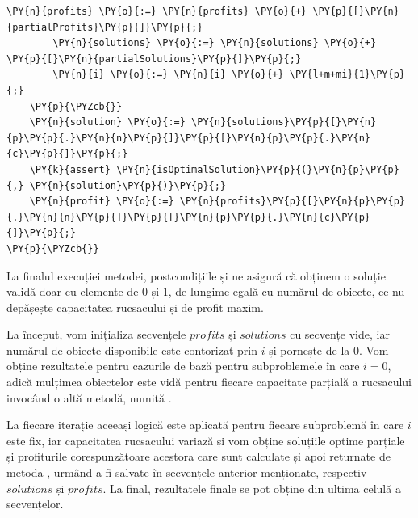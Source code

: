 \begin{sloppypar}
\begin{Verbatim}[commandchars=\\\{\}]
        \PY{n}{profits} \PY{o}{:=} \PY{n}{profits} \PY{o}{+} \PY{p}{[}\PY{n}{partialProfits}\PY{p}{]}\PY{p}{;}
        \PY{n}{solutions} \PY{o}{:=} \PY{n}{solutions} \PY{o}{+} \PY{p}{[}\PY{n}{partialSolutions}\PY{p}{]}\PY{p}{;}
        \PY{n}{i} \PY{o}{:=} \PY{n}{i} \PY{o}{+} \PY{l+m+mi}{1}\PY{p}{;} 
    \PY{p}{\PYZcb{}}
    \PY{n}{solution} \PY{o}{:=} \PY{n}{solutions}\PY{p}{[}\PY{n}{p}\PY{p}{.}\PY{n}{n}\PY{p}{]}\PY{p}{[}\PY{n}{p}\PY{p}{.}\PY{n}{c}\PY{p}{]}\PY{p}{;}
    \PY{k}{assert} \PY{n}{isOptimalSolution}\PY{p}{(}\PY{n}{p}\PY{p}{,} \PY{n}{solution}\PY{p}{)}\PY{p}{;}
    \PY{n}{profit} \PY{o}{:=} \PY{n}{profits}\PY{p}{[}\PY{n}{p}\PY{p}{.}\PY{n}{n}\PY{p}{]}\PY{p}{[}\PY{n}{p}\PY{p}{.}\PY{n}{c}\PY{p}{]}\PY{p}{;}
\PY{p}{\PYZcb{}}
\end{Verbatim}
    \par La finalul execuției metodei, postcondițiile  și  ne asigură că obținem o soluție validă doar cu elemente de 0 și 1, de lungime egală cu numărul de obiecte, ce nu depășește capacitatea rucsacului și de profit maxim.
    \par La început, vom inițializa secvențele $profits$ și $solutions$ cu secvențe vide, iar numărul de obiecte disponibile este contorizat prin $i$ și pornește de la 0. Vom obține rezultatele pentru cazurile de bază pentru subproblemele în care $i = 0$, adică mulțimea obiectelor este vidă pentru fiecare capacitate parțială a rucsacului invocând o altă metodă, 
    numită .
    \par La fiecare iterație aceeași logică este aplicată pentru fiecare subproblemă în care $i$ este fix, iar capacitatea rucsacului variază și vom obține soluțiile optime parțiale și profiturile corespunzătoare acestora care sunt calculate și apoi returnate de metoda , urmând a fi salvate în secvențele anterior menționate, respectiv $solutions$ și $profits$. La final, rezultatele finale se pot obține din ultima celulă a secvențelor. \\ \par


\end{sloppypar}
